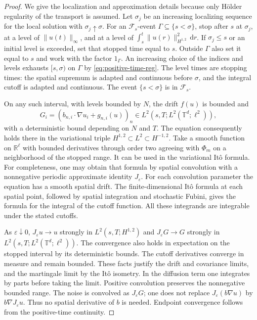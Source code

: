\documentclass[11pt]{amsart}
\theoremstyle{definition}
\newcommand{\T}{\mathbb T}
\newcommand{\R}{\mathbb R}
\newcommand{\F}{\mathcal F}
\newcommand{\ind}{1}
\newcommand{\dd}{\,\mathrm d}
\newcommand{\ellTwo}{\ell^2}
\numberwithin{equation}{section}
\begin{document}
\begin{proof}
We give the localization and approximation details because only H\"older
regularity of the transport is assumed. Let $\sigma_j$ be an increasing
localizing sequence for the local solution with $\sigma_j\uparrow\sigma$.
For an $\F_s$-event $\Gamma\subseteq\{s<\sigma\}$, stop after $s$
at $\sigma_j$, at a level of $\|u(t)\|_\infty$, and at a level of
$\int_s^t\|u(r)\|_{H^{1,2}}^2\dd r$. If $\sigma_j\leq s$ or an
initial level is exceeded, set that stopped time equal to $s$. Outside
$\Gamma$ also set it equal to $s$ and work with the factor $\ind_\Gamma$.
An increasing choice of the indices and levels exhausts $[s,\sigma)$
on $\Gamma$ by \eqref{eq:positive-time-reg}. The level times are
stopping times: the spatial supremum is adapted and continuous before
$\sigma$, and the integral cutoff is adapted and continuous. The event
$\{s<\sigma\}$ is in $\F_s$.

On any such interval, with levels bounded by $N$, the drift $f(u)$
is bounded and
\[
G_i=(b_{n,i}\cdot\nabla u_i+g_{n,i}(u))_n
 \in L^2(s,T;L^2(\T^d;\ellTwo)),
\]
with a deterministic bound depending on $N$ and $T$.
The equation consequently holds there in the variational triple
$H^{1,2}\subset L^2\subset H^{-1,2}$.
Take a smooth function on $\R^\ell$ with bounded derivatives through
order two agreeing with $\Phi_m$ on a neighborhood of the stopped
range. It can be used in the variational It\^o formula. For completeness,
one may obtain that formula by spatial convolution with a nonnegative
periodic approximate identity $J_\varepsilon$. For each convolution
parameter the equation has a smooth spatial drift. The finite-dimensional
It\^o formula at each spatial point, followed by spatial integration and
stochastic Fubini, gives the formula for the integral of the cutoff
function. All these integrands are integrable under the stated cutoffs.

As $\varepsilon\downarrow0$,
$J_\varepsilon u\to u$ strongly in $L^2(s,T;H^{1,2})$ and
$J_\varepsilon G\to G$ strongly in
$L^2(s,T;L^2(\T^d;\ellTwo))$. The convergence also holds in
expectation on the stopped interval by its deterministic bounds.
The cutoff derivatives converge in measure and remain bounded. These
facts justify the drift and covariance limits, and the martingale limit
by the It\^o isometry. In the diffusion term one integrates by parts
before taking the limit. Positive convolution preserves the nonnegative
bounded range. The noise is convolved as $J_\varepsilon G$;
one does not replace $J_\varepsilon(b\nabla u)$ by
$b\nabla J_\varepsilon u$. Thus no spatial derivative of $b$ is needed.
Endpoint convergence follows from the positive-time continuity.


\end{proof}
\end{document}
